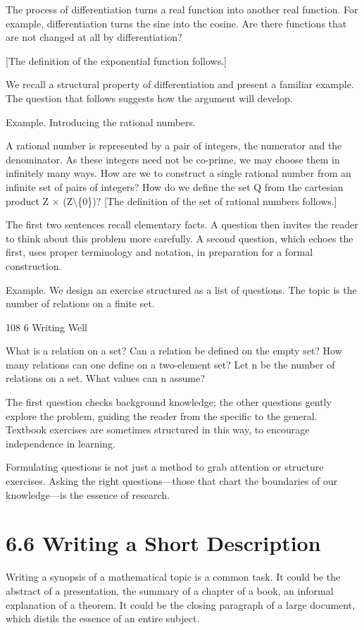 \documentclass[11pt]{article}
\theoremstyle{plain}
\theoremstyle{definition}
\begin{document}
The process of differentiation turns a real function into another real function. For example, differentiation turns the sine into the cosine. Are there functions that are not changed at all by differentiation?

[The definition of the exponential function follows.]

We recall a structural property of differentiation and present a familiar example. The question that follows suggests how the argument will develop.

Example. Introducing the rational numbers.

A rational number is represented by a pair of integers, the numerator and the denominator. As these integers need not be co-prime, we may choose them in infinitely many ways. How are we to construct a single rational number from an infinite set of pairs of integers? How do we define the set Q from the cartesian product Z $\times$ (Z$\setminus$\{0\})? [The definition of the set of rational numbers follows.]

The first two sentences recall elementary facts. A question then invites the reader to think about this problem more carefully. A second question, which echoes the first, uses proper terminology and notation, in preparation for a formal construction.

Example. We design an exercise structured as a list of questions. The topic is the number of relations on a finite set.

108 6 Writing Well

What is a relation on a set? Can a relation be defined on the empty set? How many relations can one define on a two-element set? Let n be the number of relations on a set. What values can n assume?

The first question checks background knowledge; the other questions gently explore the problem, guiding the reader from the specific to the general. Textbook exercises are sometimes structured in this way, to encourage independence in learning.

Formulating questions is not just a method to grab attention or structure exercises. Asking the right questions---those that chart the boundaries of our knowledge---is the essence of research.

\section{6.6 Writing a Short Description}

Writing a synopsis of a mathematical topic is a common task. It could be the abstract of a presentation, the summary of a chapter of a book, an informal explanation of a theorem. It could be the closing paragraph of a large document, which distils the essence of an entire subject.
\end{document}
